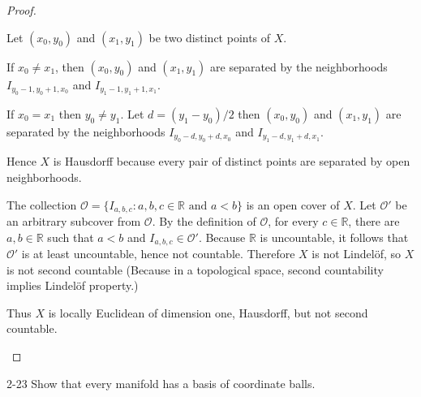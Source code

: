 \begin{proof}
\begin{enumerate}[label={(\alph*)}]
		      Let $(x_{0}, y_{0})$ and $(x_{1}, y_{1})$ be two distinct points of $X$.

		      If $x_{0}\ne x_{1}$, then $(x_{0}, y_{0})$ and $(x_{1}, y_{1})$ are separated by the neighborhoods $I_{y_{0}-1, y_{0}+1, x_{0}}$ and $I_{y_{1}-1, y_{1}+1, x_{1}}$.

		      If $x_{0} = x_{1}$ then $y_{0}\ne y_{1}$. Let $d = (y_{1} - y_{0})/2$ then $(x_{0}, y_{0})$ and $(x_{1}, y_{1})$ are separated by the neighborhoods $I_{y_{0} - d, y_{0}+d, x_{0}}$ and $I_{y_{1}-d, y_{1}+d, x_{1}}$.

		      Hence $X$ is Hausdorff because every pair of distinct points are separated by open neighborhoods.

		      The collection $\mathcal{O} = \{ I_{a,b,c}: a, b, c\in\mathbb{R} \text{ and } a < b \}$ is an open cover of $X$. Let $\mathcal{O}'$ be an arbitrary subcover from $\mathcal{O}$. By the definition of $\mathcal{O}$, for every $c\in\mathbb{R}$, there are $a, b\in\mathbb{R}$ such that $a < b$ and $I_{a,b,c}\in\mathcal{O}'$. Because $\mathbb{R}$ is uncountable, it follows that $\mathcal{O}'$ is at least uncountable, hence not countable. Therefore $X$ is not Lindelöf, so $X$ is not second countable (Because in a topological space, second countability implies Lindelöf property.)

		      Thus $X$ is locally Euclidean of dimension one, Hausdorff, but not second countable.
	\end{enumerate}
\end{proof}

\begin{problem}{2-23}
Show that every manifold has a basis of coordinate balls.
\end{problem}

